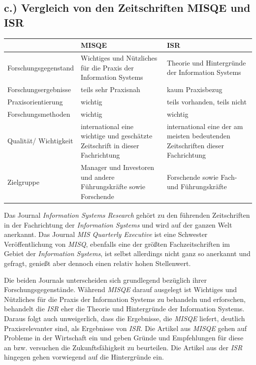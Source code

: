 \documentclass[12pt,utf8]{scrartcl}
\begin{document}
\begin{flushleft}
\subsection*{\label{sub3:einfuehrung}c.) Vergleich von den Zeitschriften MISQE und ISR}

\begin{tabular}{|p{4cm}|p{5.5cm}|p{5.5cm}|}
\hline
& MISQE & ISR \\
\hline
Forschungsgegenstand & Wichtiges und Nützliches für die Praxis der Information Systems & Theorie und Hintergründe der Information Systems \\
\hline
Forschungsergebnisse & teils sehr Praxisnah & kaum Praxisbezug \\
\hline
Praxisorientierung & wichtig & teils vorhanden, teils nicht \\
\hline
Forschungsmethoden & wichtig & wichtig \\
\hline
Qualität/ Wichtigkeit & international eine wichtige und geschätzte Zeitschrift in dieser Fachrichtung & international eine der am meisten bedeutenden Zeitschriften dieser Fachrichtung \\
\hline
Zielgruppe & Manager und Investoren und andere Führungskräfte sowie Forschende & Forschende sowie Fach- und Führungskräfte \\
\hline
\end{tabular}
\newline
\newline
\newline

Das Journal \emph{Information Systems Research} gehört zu den führenden Zeitschriften in der Fachrichtung der \emph{Information Systems} und wird auf der ganzen Welt anerkannt. Das Journal \emph{MIS Quarterly Executive} ist eine Schwester Veröffentlichung von \emph{MISQ}\citep{MISQE}, ebenfalls eine der größten Fachzeitschriften im Gebiet der \emph{Information Systems}, ist selbst allerdings nicht ganz so anerkannt und gefragt, genießt aber dennoch einen relativ hohen Stellenwert.

Die beiden Journals unterscheiden sich grundlegend bezüglich ihrer Forschungsgegenstände. Während \emph{MISQE} darauf ausgelegt ist Wichtiges und Nützliches für die Praxis der Information Systems zu behandeln und erforschen\citep{MISQE}, behandelt die \emph{ISR} eher die Theorie und Hintergründe der Information Systems\citep{ISR}. Daraus folgt auch unweigerlich, dass die Ergebnisse, die \emph{MISQE} liefert, deutlich Praxisrelevanter sind, als Ergebnisse von \emph{ISR}. Die Artikel aus \emph{MISQE} gehen auf Probleme in der Wirtschaft ein und geben Gründe und Empfehlungen für diese an bzw. versuchen die Zukunftsfähigkeit zu beurteilen\citep{Chasin2017}\cite{Lacity2017}. Die Artikel aus der \emph{ISR} hingegen gehen vorwiegend auf die Hintergründe ein\cite{Karhu2018}\cite{Constantinides2018}.


\end{flushleft}
\end{document}
